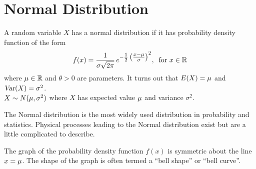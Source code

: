 \section{Normal Distribution}
A random variable $X$ has a normal distribution if it has probability density function of the form
\[
    f(x) = \frac{1}{\sigma\sqrt{2\pi}}\,
    e^{-\textstyle\frac{1}{2} \left(\frac{x - \mu}{\sigma}\right)^2}
    ,\:\text{ for } x \in \mathbb{R}
\]
where $\mu \in \mathbb{R}$ and $\theta>0$ are parameters. It turns out that $E(X) = \mu$ and $\operatorname{\textsl{Var}}(X) = \sigma^2$. \\
$X \sim N(\mu,\sigma^2)$ where $X$ has expected value $\mu$ and variance $\sigma^2$.
\medskip

The Normal distribution is the most widely used distribution in probability and statistics. Physical
processes leading to the Normal distribution exist but are a little complicated to describe.
\smallskip\par
The graph of the probability density function $f(x)$ is symmetric about the line $x = \mu$. The shape of the graph is often termed a ``bell shape'' or ``bell curve''.
\begin{center}
\end{center}

